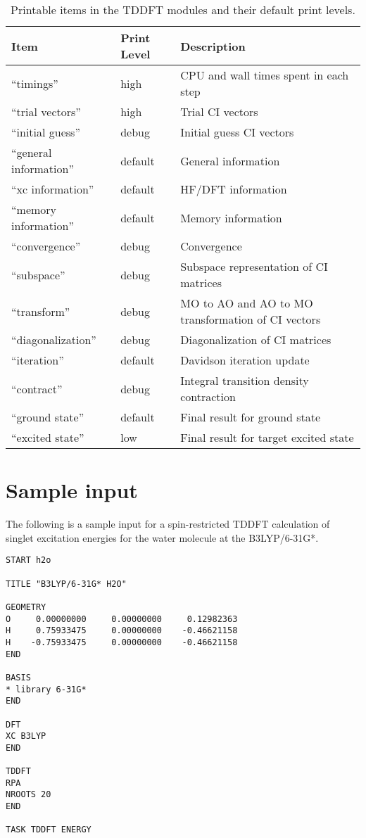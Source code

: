 \begin{table}[htbp]
\begin{center}
\caption{Printable items in the TDDFT modules and their default print levels.}
\label{tbl:tddft-printable}
\begin{tabular}{lll}
\hline\hline
Item                     & Print Level   & Description \\
\hline 
``timings''              & high          & CPU and wall times spent in each step \\
``trial vectors''        & high          & Trial CI vectors \\
``initial guess''        & debug         & Initial guess CI vectors \\
``general information''  & default       & General information \\
``xc information''       & default       & HF/DFT information \\
``memory information''   & default       & Memory information \\
``convergence''          & debug         & Convergence \\
``subspace''             & debug         & Subspace representation of CI matrices \\
``transform''            & debug         & MO to AO and AO to MO transformation of CI vectors \\
``diagonalization''      & debug         & Diagonalization of CI matrices \\
``iteration''            & default       & Davidson iteration update \\
``contract''             & debug         & Integral transition density contraction \\
``ground state''         & default       & Final result for ground state \\
``excited state''        & low           & Final result for target excited state \\
\hline\hline
\end{tabular}
\end{center}
\end{table}

\section{Sample input}

The following is a sample input for a spin-restricted TDDFT calculation of 
singlet excitation energies for the water molecule at the B3LYP/6-31G*.
\begin{verbatim}
START h2o

TITLE "B3LYP/6-31G* H2O"

GEOMETRY
O     0.00000000     0.00000000     0.12982363
H     0.75933475     0.00000000    -0.46621158
H    -0.75933475     0.00000000    -0.46621158
END

BASIS
* library 6-31G*
END

DFT
XC B3LYP
END

TDDFT
RPA
NROOTS 20
END

TASK TDDFT ENERGY
\end{verbatim}

